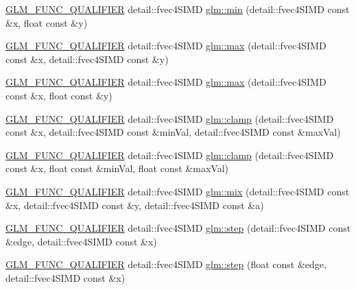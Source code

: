 \begin{DoxyCompactItemize}
\item 
\hyperlink{setup_8hpp_a33fdea6f91c5f834105f7415e2a64407}{G\+L\+M\+\_\+\+F\+U\+N\+C\+\_\+\+Q\+U\+A\+L\+I\+F\+I\+ER} detail\+::fvec4\+S\+I\+MD \hyperlink{namespaceglm_ace53be5aa101f55503d1fd863ac97de3}{glm\+::min} (detail\+::fvec4\+S\+I\+MD const \&x, float const \&y)
\item 
\hyperlink{setup_8hpp_a33fdea6f91c5f834105f7415e2a64407}{G\+L\+M\+\_\+\+F\+U\+N\+C\+\_\+\+Q\+U\+A\+L\+I\+F\+I\+ER} detail\+::fvec4\+S\+I\+MD \hyperlink{namespaceglm_a8003e838df57188edaa8b8fe512516a6}{glm\+::max} (detail\+::fvec4\+S\+I\+MD const \&x, detail\+::fvec4\+S\+I\+MD const \&y)
\item 
\hyperlink{setup_8hpp_a33fdea6f91c5f834105f7415e2a64407}{G\+L\+M\+\_\+\+F\+U\+N\+C\+\_\+\+Q\+U\+A\+L\+I\+F\+I\+ER} detail\+::fvec4\+S\+I\+MD \hyperlink{namespaceglm_a6a8611ddc96e204e7669872c6a68b972}{glm\+::max} (detail\+::fvec4\+S\+I\+MD const \&x, float const \&y)
\item 
\hyperlink{setup_8hpp_a33fdea6f91c5f834105f7415e2a64407}{G\+L\+M\+\_\+\+F\+U\+N\+C\+\_\+\+Q\+U\+A\+L\+I\+F\+I\+ER} detail\+::fvec4\+S\+I\+MD \hyperlink{namespaceglm_a5c4a12e002e5eb23b8a12639c7484378}{glm\+::clamp} (detail\+::fvec4\+S\+I\+MD const \&x, detail\+::fvec4\+S\+I\+MD const \&min\+Val, detail\+::fvec4\+S\+I\+MD const \&max\+Val)
\item 
\hyperlink{setup_8hpp_a33fdea6f91c5f834105f7415e2a64407}{G\+L\+M\+\_\+\+F\+U\+N\+C\+\_\+\+Q\+U\+A\+L\+I\+F\+I\+ER} detail\+::fvec4\+S\+I\+MD \hyperlink{namespaceglm_ae7db62bebbc1cdea7444d6f89313af2f}{glm\+::clamp} (detail\+::fvec4\+S\+I\+MD const \&x, float const \&min\+Val, float const \&max\+Val)
\item 
\hyperlink{setup_8hpp_a33fdea6f91c5f834105f7415e2a64407}{G\+L\+M\+\_\+\+F\+U\+N\+C\+\_\+\+Q\+U\+A\+L\+I\+F\+I\+ER} detail\+::fvec4\+S\+I\+MD \hyperlink{namespaceglm_a4b388e53d27196411517929d6ee91867}{glm\+::mix} (detail\+::fvec4\+S\+I\+MD const \&x, detail\+::fvec4\+S\+I\+MD const \&y, detail\+::fvec4\+S\+I\+MD const \&a)
\item 
\hyperlink{setup_8hpp_a33fdea6f91c5f834105f7415e2a64407}{G\+L\+M\+\_\+\+F\+U\+N\+C\+\_\+\+Q\+U\+A\+L\+I\+F\+I\+ER} detail\+::fvec4\+S\+I\+MD \hyperlink{namespaceglm_a0af681288eaacb38ded2a597bc7fd214}{glm\+::step} (detail\+::fvec4\+S\+I\+MD const \&edge, detail\+::fvec4\+S\+I\+MD const \&x)
\item 
\hyperlink{setup_8hpp_a33fdea6f91c5f834105f7415e2a64407}{G\+L\+M\+\_\+\+F\+U\+N\+C\+\_\+\+Q\+U\+A\+L\+I\+F\+I\+ER} detail\+::fvec4\+S\+I\+MD \hyperlink{namespaceglm_ac7e3b091e30c01352c8349c656d52a9f}{glm\+::step} (float const \&edge, detail\+::fvec4\+S\+I\+MD const \&x)

\end{DoxyCompactItemize}
